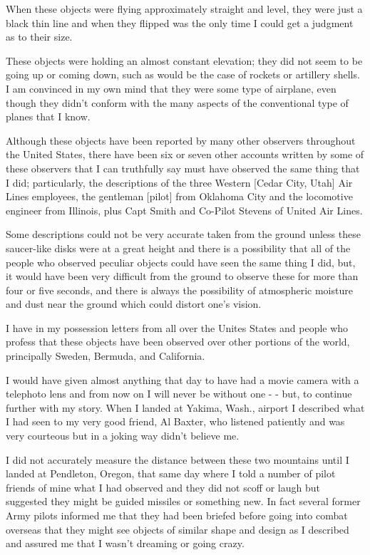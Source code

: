 \begin{svgraybox}
      When these objects were flying approximately straight and level, they were just a black thin line and when they flipped was the only time I could get a judgment as to their size.

      These objects were holding an almost constant elevation; they did not seem to be going up or coming down, such as would be the case of rockets or artillery shells. I am convinced in my own mind that they were some type of airplane, even though they didn't conform with the many aspects of the conventional type of planes that I know.

      Although these objects have been reported by many other observers throughout the United States, there have been six or seven other accounts written by some of these observers that I can truthfully say must have observed the same thing that I did; particularly, the descriptions of the three Western [Cedar City, Utah] Air Lines employees, the gentleman [pilot] from Oklahoma City and the locomotive engineer from Illinois, plus Capt Smith and Co-Pilot Stevens of United Air Lines.

      Some descriptions could not be very accurate taken from the ground unless these saucer-like disks were at a great height and there is a possibility that all of the people who observed peculiar objects could have seen the same thing I did, but, it would have been very difficult from the ground to observe these for more than four or five seconds, and there is always the possibility of atmospheric moisture and dust near the ground which could distort one's vision.

      I have in my possession letters from all over the Unites States and people who profess that these objects have been observed over other portions of the world,
      principally Sweden, Bermuda, and California.

      I would have given almost anything that day to have had a movie camera with a telephoto lens and from now on I will never be without one - - but, to continue further with my story. When I landed at Yakima, Wash., airport I described what I had seen to my very good friend, Al Baxter, who listened patiently and was very courteous but in a joking way didn't believe me.

      I did not accurately measure the distance between these two mountains until I landed at Pendleton, Oregon, that same day where I told a number of pilot friends of mine what I had observed and they did not scoff or laugh but suggested they might be guided missiles or something new. In fact several former Army pilots informed me that they had been briefed before going into combat overseas that they might see objects of similar shape and design as I described and assured me that I wasn't dreaming or going crazy.


\end{svgraybox}

